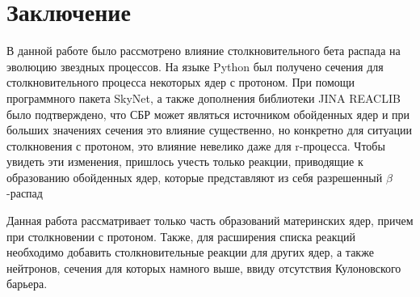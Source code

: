 \documentclass[%
master,    %
natbib,      %
subf,        %
href,        %
colorlinks,  %
]{disser}
\begin{document}
\section{Заключение}

В данной работе было рассмотрено влияние столкновительного бета распада на эволюцию звездных процессов. На языке Python был получено сечения для столкновительного процесса некоторых ядер с протоном. При помощи программного пакета SkyNet, а также дополнения библиотеки JINA REACLIB было подтверждено, что СБР может являться источником обойденных ядер и при больших значениях сечения это влияние существенно, но конкретно для ситуации столкновения с протоном, это влияние невелико даже для r-процесса. Чтобы увидеть эти изменения, пришлось учесть только реакции, приводящие к образованию обойденных ядер, которые представляют из себя разрешенный $\beta$-распад

Данная работа рассматривает только часть образований материнских ядер, причем при столкновении с протоном. Также, для расширения списка реакций необходимо добавить столкновительные реакции для других ядер, а также нейтронов, сечения для которых намного выше, ввиду отсутствия Кулоновского барьера.



\end{document}
